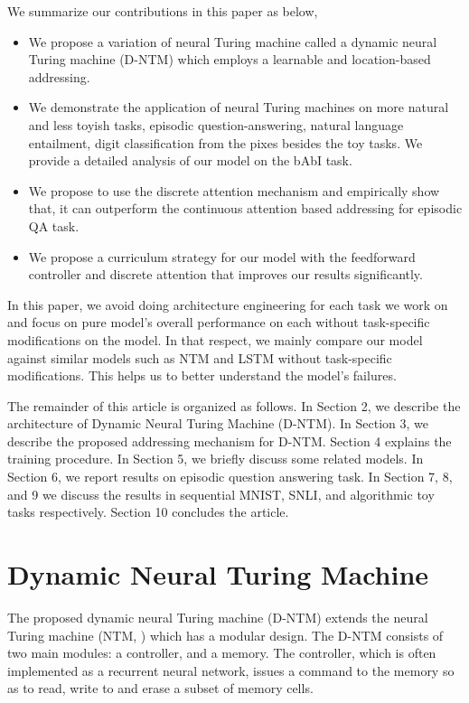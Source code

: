 \documentclass[12pt]{article}
\begin{document}
We summarize our contributions in this paper as below,

\begin{itemize}
    \item We propose a variation of neural Turing machine called a dynamic
        neural Turing machine (D-NTM) which employs a learnable and location-based
        addressing.
    \item We demonstrate the application of neural Turing machines on more natural
        and less toyish tasks, episodic question-answering, natural language entailment, digit classification 
        from the pixes besides the toy tasks. We provide a detailed analysis of our model on the bAbI task.
    \item We propose to use the discrete attention mechanism and empirically show
        that, it can outperform the continuous attention based addressing for episodic QA task.
    \item We propose a curriculum strategy for our model with the feedforward controller
    and discrete attention that improves our results significantly.
\end{itemize}

In this paper, we avoid doing architecture engineering for each task we work on and focus on pure model's overall performance on each without task-specific modifications on the model. In that respect, we mainly compare our model against similar models such as NTM and LSTM  without task-specific modifications. This helps us to better understand the model's failures.

The remainder of this article is organized as follows. In Section 2, we describe the architecture of Dynamic Neural Turing Machine (D-NTM). In Section 3, we describe the proposed addressing mechanism for D-NTM. Section 4 explains the training procedure. In Section 5, we briefly  discuss some related models. In Section 6, we report results on episodic question answering task. In Section 7, 8, and 9 we discuss the results in sequential MNIST, SNLI, and algorithmic toy tasks respectively. Section 10 concludes the article. 

\section{Dynamic Neural Turing Machine}

The proposed dynamic neural Turing machine (D-NTM) extends the neural Turing
machine (NTM, \citep{graves2014neural}) which has a modular design. The D-NTM
consists of two main modules: a controller, and a memory. The controller, which is
often implemented as a recurrent neural network, issues a command to the memory
so as to read, write to and erase a subset of memory cells. 
\end{document}
